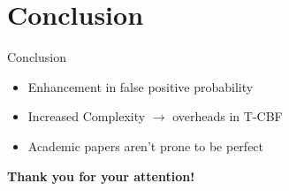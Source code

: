 \documentclass[
  english,            %
  aspectratio=169,    %
]{tumbeamer}
\begin{document}
\section{Conclusion}
\begin{frame}{Conclusion}{}
    \begin{itemize}
        \item Enhancement in false positive probability
        \item Increased Complexity $\rightarrow$ overheads in T-CBF
        \item Academic papers aren’t prone to be perfect
    \end{itemize}
\end{frame}

\begin{frame}
  \begin{center}
    \vspace*{\fill}
    
     \textbf{\Huge \textcolor{blue!90!black}{Thank you for your attention!}}
    \vspace*{\fill}
  \end{center}
\end{frame}
\end{document}
